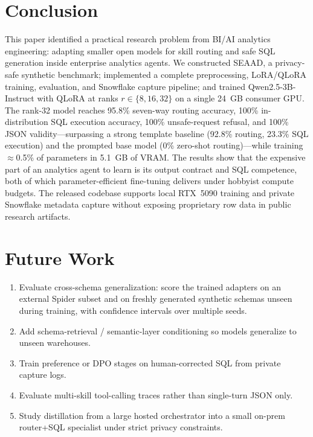 \documentclass[conference]{IEEEtran}
\begin{document}
\section{Conclusion}
\label{sec:conclusion}
This paper identified a practical research problem from BI/AI analytics engineering: adapting smaller open models for skill routing and safe SQL generation inside enterprise analytics agents. We constructed SEAAD, a privacy-safe synthetic benchmark; implemented a complete preprocessing, LoRA/QLoRA training, evaluation, and Snowflake capture pipeline; and trained Qwen2.5-3B-Instruct with QLoRA at ranks $r\in\{8,16,32\}$ on a single 24~GB consumer GPU. The rank-32 model reaches 95.8\% seven-way routing accuracy, 100\% in-distribution SQL execution accuracy, 100\% unsafe-request refusal, and 100\% JSON validity---surpassing a strong template baseline (92.8\% routing, 23.3\% SQL execution) and the prompted base model (0\% zero-shot routing)---while training $\approx$0.5\% of parameters in 5.1~GB of VRAM. The results show that the expensive part of an analytics agent to learn is its output contract and SQL competence, both of which parameter-efficient fine-tuning delivers under hobbyist compute budgets. The released codebase supports local RTX~5090 training and private Snowflake metadata capture without exposing proprietary row data in public research artifacts.
\section{Future Work}
\label{sec:future}
\begin{enumerate}
\item Evaluate cross-schema generalization: score the trained adapters on an external Spider subset and on freshly generated synthetic schemas unseen during training, with confidence intervals over multiple seeds.
\item Add schema-retrieval / semantic-layer conditioning so models generalize to unseen warehouses.
\item Train preference or DPO stages on human-corrected SQL from private capture logs.
\item Evaluate multi-skill tool-calling traces rather than single-turn JSON only.
\item Study distillation from a large hosted orchestrator into a small on-prem router+SQL specialist under strict privacy constraints.
\end{enumerate}
\end{document}
